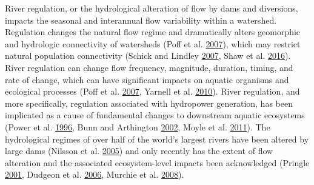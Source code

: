 \documentclass[proquest,12pt,final]{ucthesis-CA2012} %
\begin{document}
\begin{ucmainmatter}
River regulation, or the hydrological alteration of flow by dams and
diversions, impacts the seasonal and interannual flow variability within
a watershed. Regulation changes the natural flow regime and dramatically
alters geomorphic and hydrologic connectivity of watersheds (Poff et al.
\protect\hyperlink{ref-poff_homogenization_2007}{2007}), which may
restrict natural population connectivity (Schick and Lindley
\protect\hyperlink{ref-schick_directed_2007}{2007}, Shaw et al.
\protect\hyperlink{ref-shaw_importance_2016}{2016}). River regulation
can change flow frequency, magnitude, duration, timing, and rate of
change, which can have significant impacts on aquatic organisms and
ecological processes (Poff et al.
\protect\hyperlink{ref-poff_homogenization_2007}{2007}, Yarnell et al.
\protect\hyperlink{ref-yarnell_ecology_2010}{2010}). River regulation,
and more specifically, regulation associated with hydropower generation,
has been implicated as a cause of fundamental changes to downstream
aquatic ecosystems (Power et al.
\protect\hyperlink{ref-power_dams_1996}{1996}, Bunn and Arthington
\protect\hyperlink{ref-bunn_basic_2002}{2002}, Moyle et al.
\protect\hyperlink{ref-moyle_rapid_2011}{2011}). The hydrological
regimes of over half of the world's largest rivers have been altered by
large dams (Nilsson et al.
\protect\hyperlink{ref-nilsson_fragmentation_2005}{2005}) and only
recently has the extent of flow alteration and the associated
ecosystem-level impacts been acknowledged (Pringle
\protect\hyperlink{ref-pringle_hydrologic_2001}{2001}, Dudgeon et al.
\protect\hyperlink{ref-dudgeon_freshwater_2006}{2006}, Murchie et al.
\protect\hyperlink{ref-murchie_fish_2008}{2008}).


\end{ucmainmatter}
\end{document}
